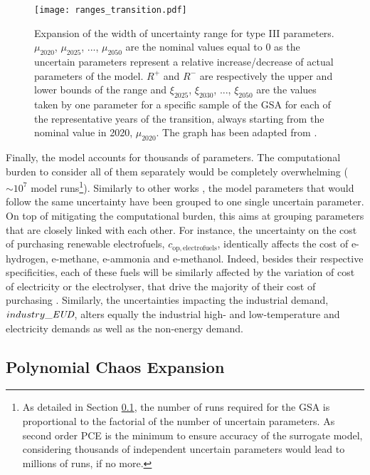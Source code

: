 \begin{figure}[htbp!]
\centering
\texttt{[image: ranges\_transition.pdf]}
\caption{Expansion of the width of uncertainty range for type III parameters. $\mu_{2020}$, $\mu_{2025}$, ...,  $\mu_{2050}$ are the nominal values equal to 0 as the uncertain parameters represent a relative increase/decrease of actual parameters of the model. $R^+$ and $R^-$ are respectively the upper and lower bounds of the range and $\xi_{2025}$, $\xi_{2030}$, ...,  $\xi_{2050}$ are the values taken by one parameter for a specific sample of the \gls{GSA} for each of the representative years of the transition, always starting from the nominal value in 2020, $\mu_{2020}$. The graph has been adapted from \cite{guevara2022modeling}.}
\label{fig:ranges_transition}
\end{figure}

Finally, the model accounts for thousands of parameters. The computational burden to consider all of them separately would be completely overwhelming ($\sim 10^7$ model runs\footnote{As detailed in Section \ref{subsec:pce}, the number of runs required for the \gls{GSA} is proportional to the factorial of the number of uncertain parameters. As second order \gls{PCE} is the minimum to ensure accuracy of the surrogate model, considering thousands of independent uncertain parameters would lead to millions of runs, if no more.}). Similarly to other works \cite{Moret2017,limpens2020impact}, the model parameters that would follow the same uncertainty have been grouped to one single uncertain parameter. On top of mitigating the computational burden, this aims at grouping parameters that are closely linked with each other. For instance, the uncertainty on the cost of purchasing renewable electrofuels, $c_{\mathrm{op,electrofuels}}$, identically affects the cost of e-hydrogen, e-methane, e-ammonia and e-methanol. Indeed, besides their respective specificities, each of these fuels will be similarly affected by the variation of cost of electricity or the electrolyser, that drive the majority of their cost of purchasing \cite{h2coalition}. Similarly, the uncertainties impacting the industrial demand, $industry\_\emph{EUD}$, alters equally the industrial high- and low-temperature and electricity demands as well as the non-energy demand.

\subsection{Polynomial Chaos Expansion}
\label{subsec:pce}

